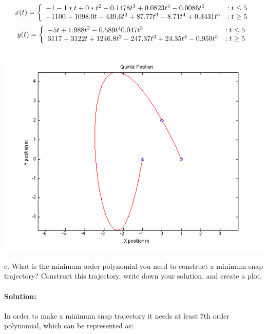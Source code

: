 \documentclass[english]{article}
\begin{document}
\paragraph{}
 \begin{displaymath}
   x(t) = \left\{
     \begin{array}{lr}
       $$-1-1*t + 0*t^2 -0.1478t^3  +0.0823t^4 -0.0086t^5$$& : t \leq 5\\
       $$-1100 +1098.0t -439.6t^2 +87.77t^3 -8.71t^4 +0.3431t^5 $$ & : t \geq 5
     \end{array}
   \right.
\end{displaymath} 
\begin{displaymath}
   y(t) = \left\{
     \begin{array}{lr}  
       $$ - 5t +1.988t^3 -0.589t^4 0.047t^5$$& : t \leq 5\\
       $$ 3117 -3122t +1246.8t^2 -247.37t^3 + 24.35t^4 -0.950t^5 $$ & : t \geq 5
     \end{array}
   \right.
\end{displaymath} 
\\
\includegraphics[width = \textwidth]{quintic.png}

c. What is the minimum order polynomial you need to construct a minimum snap trajectory? Construct this trajectory, write down your solution, and create a plot. 
\paragraph{Solution:}
In order to make a minimum snap trajectory it needs at least 7th order polynomial, which can be represented as: 
\end{document}
